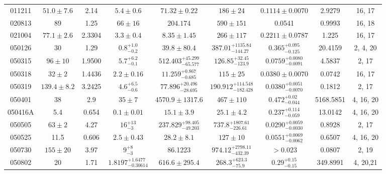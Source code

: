 \documentclass[a4paper,fleqn,usenatbib]{mnras}
\begin{document}
\begin{table*}
\begin{tabular}[width=1.0 \linewidth]{ccccccccc}
\\																																																																					011211 &	$51.0 \pm7.6$ &	2.14 &	$5.4\pm0.6 $ &	 $71.32\pm0.22$ &	$186\pm24$ &	$0.1114\pm0.0070$ &	2.9279 &	16, 17 \\																																																																					020813 &	89 &	1.25 &	$66 \pm 16 $ &	   $204.174$ &	$590 \pm 151$ &	0.0541 &	0.9993 &	16, 18 \\																																																																					021004 &	$77.1 \pm2.6$ &	2.3304  &	$3.3 \pm 0.4 $ &	$8.35\pm 1.45$ &	$266 \pm 117$ &	$0.2211\pm0.0787$ &	1.225 &	16, 17 \\																																																																					050126 &	30 &	1.29 &	$0.8_{-0.2}^{+1.0} $ &	$39.8\pm80.4$ &	$387.01_{-144.27}^{+1135.84}$ &	$0.365_{-0.125}^{+0.095}$ &	20.4159 &	2, 4, 20 \\																																																																					050315 &	$96 \pm10$ &	1.9500  &	$5.7_{-0.1}^{+6.2} $ & $512.403_{-65.577}^{+45.299}$ &	$126.85_{-123.9}^{+32.45}$ &$0.0759_{-0.0091}^{+0.0080}$ &	4.5837 &	2, 17 \\																																																																					050318 &	$32\pm2$ &	1.4436  &	$2.2 \pm 0.16 $ &	$11.259_{-0.685}^{+0.867}$ &	$115\pm25$ &	$0.0380\pm0.0070$ &	0.0742 &	16, 17 \\																																																																					050319 &$139.4 \pm 8.2$ &3.2425 &$4.6_{-0.6}^{+6.5}$ &	$77.896_{-28.695}^{+20.496}$ &$190.912_{-182.428}^{+114.548}$ &$0.0380_{-0.0070}^{+0.0051}$ &	0.1812 &	2, 17 \\																																																																					050401 &	38 &	2.9 &	$35 \pm 7$ &	    $4570.9\pm1317.6$ &	$467\pm110$ &	$0.472_{-0.044}^{+0.02}$ &	5168.5851 &	4, 16, 20  \\																																																																					050416A &	5.4 &	0.654 &	$0.1 \pm 0.01$ &	    $15.1\pm 3.9$ &	$25.1\pm4.2$ &	$0.237_{-0.059}^{+0.114}$ &	13.0142 &	4, 16, 20  \\																																																																					050505 &	$63\pm2$ &	4.27 &	$16_{-3}^{+13}$ &$237.829_{-49.203}^{+98.405}$ &	$737.8_{-226.61}^{+1807.61}$ &	$0.0290_{-0.0030}^{+0.0059}$ &	0.8928 &2, 17 \\																																																																					050525  &	11.5 &	0.606 &	$2.5 \pm 0.43$ &	    $28.2\pm 8.1$ &	$127\pm10$ &	$0.0551_{-0.0062}^{+0.0069}$ &	0.6507 &	4, 16, 20  \\																																																																					050730 &	$155\pm20$ &	3.97 &	$9_{-3}^{+8}$ &	86.1223 &	$974.12_{-432.39}^{+2798.11}$ &	$>0.023$ &	0.0807 &	2, 19 \\																																																																					050802 &	20 &	1.71 &	$1.8197_{-0.30614}^{+1.6477}$ &	    $616.6\pm 295.4$ &	$268.3_{-75.9}^{+623.3}$ &	$0.29_{-0.15}^{+0.15}$ &349.8991 &	4, 20,21 
\end{tabular}
\end{table*}
\end{document}
